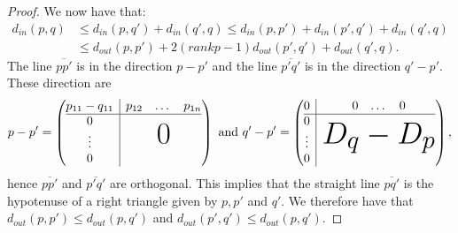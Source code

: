 \documentclass[a4paper,oneside]{amsart}
\theoremstyle{definition}
\begin{document}
\begin{proof}
We now have that:
\begin{align}\label{inequalitygeneric}
d_{in}(p,q) &\leq d_{in}(p,q')+ d_{in}(q',q) \leq d_{in}(p,p') +
d_{in}(p',q')+ d_{in}(q',q) \\ &\leq d_{out}(p,p') + 2(rank
p-1)d_{out}(p',q') + d_{out}(q',q).\nonumber
\end{align}
The line $\overline{pp'}$ is in the direction $p-p'$ and the line
$\overline{p'q '}$ is in the direction $q'-p'$. These direction are
\begin{align*}
p-p'=\left(
\begin{array}{@{} c | c @{}}
p_{11}-q_{11} & \begin{matrix} p_{12} & \dots & p_{1n} \end{matrix} \\ \hline
\begin{matrix} 0 \\ \vdots \\ 0 \end{matrix} & \text{\Huge $0$}
\end{array}
\right)\text{ and } q'-p'=\left(
\begin{array}{@{} c | c @{}}
0 & \begin{matrix} 0 & \dots & 0 \end{matrix} \\ \hline
\begin{matrix} 0 \\ \vdots \\ 0 \end{matrix} & \text{\Huge
  $D_q-D_p$}
\end{array}
\right),
\end{align*}
hence $\overline{pp'}$ and $\overline{p'q '}$ are orthogonal. This
implies that the straight line $\overline{pq'}$ is the hypotenuse of a
right triangle given by $p,p'$ and $q'$. We therefore have that
$d_{out}(p,p') \leq d_{out}(p,q')$ and $d_{out}(p',q') \leq
d_{out}(p,q')$. 


\end{proof}
\end{document}
